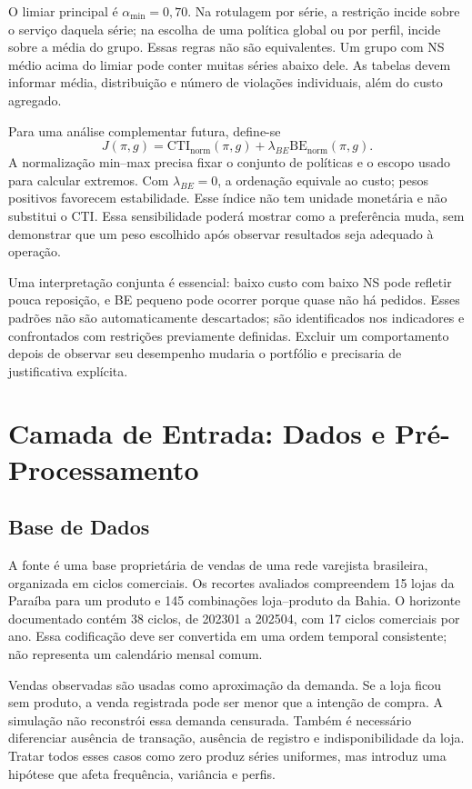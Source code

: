 O limiar principal é $\alpha_{\min}=0{,}70$. Na rotulagem por série, a restrição incide sobre o serviço daquela série; na escolha de uma política global ou por perfil, incide sobre a média do grupo. Essas regras não são equivalentes. Um grupo com NS médio acima do limiar pode conter muitas séries abaixo dele. As tabelas devem informar média, distribuição e número de violações individuais, além do custo agregado.

Para uma análise complementar futura, define-se
\[
J(\pi,g)=\mathrm{CTI}_{\mathrm{norm}}(\pi,g)+\lambda_{BE}\mathrm{BE}_{\mathrm{norm}}(\pi,g).
\]
A normalização min--max precisa fixar o conjunto de políticas e o escopo usado para calcular extremos. Com $\lambda_{BE}=0$, a ordenação equivale ao custo; pesos positivos favorecem estabilidade. Esse índice não tem unidade monetária e não substitui o CTI. Essa sensibilidade poderá mostrar como a preferência muda, sem demonstrar que um peso escolhido após observar resultados seja adequado à operação.

Uma interpretação conjunta é essencial: baixo custo com baixo NS pode refletir pouca reposição, e BE pequeno pode ocorrer porque quase não há pedidos. Esses padrões não são automaticamente descartados; são identificados nos indicadores e confrontados com restrições previamente definidas. Excluir um comportamento depois de observar seu desempenho mudaria o portfólio e precisaria de justificativa explícita.

\section{Camada de Entrada: Dados e Pré-Processamento}
\subsection{Base de Dados}

A fonte é uma base proprietária de vendas de uma rede varejista brasileira, organizada em ciclos comerciais. Os recortes avaliados compreendem 15 lojas da Paraíba para um produto e 145 combinações loja--produto da Bahia. O horizonte documentado contém 38 ciclos, de 202301 a 202504, com 17 ciclos comerciais por ano. Essa codificação deve ser convertida em uma ordem temporal consistente; não representa um calendário mensal comum.

Vendas observadas são usadas como aproximação da demanda. Se a loja ficou sem produto, a venda registrada pode ser menor que a intenção de compra. A simulação não reconstrói essa demanda censurada. Também é necessário diferenciar ausência de transação, ausência de registro e indisponibilidade da loja. Tratar todos esses casos como zero produz séries uniformes, mas introduz uma hipótese que afeta frequência, variância e perfis.

